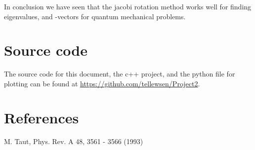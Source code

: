 \documentclass{aa}   %
\begin{document}
In conclusion we have seen that the jacobi rotation method works well for finding eigenvalues, and -vectors for quantum mechanical problems.

\section{Source code}\label{sec:source}
The source code for this document, the c++ project, and the python file for plotting can be found at \url{https://github.com/tellewsen/Project2}.




\section{References}
M. Taut, Phys. Rev. A 48, 3561 - 3566 (1993)

\end{document}

